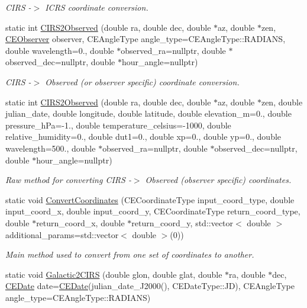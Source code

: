 \begin{DoxyCompactItemize}
\begin{DoxyCompactList}\small\item\em C\+I\+R\+S -\/$>$ I\+C\+R\+S coordinate conversion. \end{DoxyCompactList}\item 
static int \hyperlink{class_c_e_coordinates_a8b3cadaf04a15c5bb281b5aea675c7e9}{C\+I\+R\+S2\+Observed} (double ra, double dec, double $\ast$az, double $\ast$zen, \hyperlink{class_c_e_observer}{C\+E\+Observer} observer, C\+E\+Angle\+Type angle\+\_\+type=C\+E\+Angle\+Type\+::\+R\+A\+D\+I\+A\+N\+S, double wavelength=0., double $\ast$observed\+\_\+ra=nullptr, double $\ast$observed\+\_\+dec=nullptr, double $\ast$hour\+\_\+angle=nullptr)
\begin{DoxyCompactList}\small\item\em C\+I\+R\+S -\/$>$ Observed (or observer specific) coordinate conversion. \end{DoxyCompactList}\item 
static int \hyperlink{class_c_e_coordinates_aa77d308ed8537f8cd42df293e51c5eb6}{C\+I\+R\+S2\+Observed} (double ra, double dec, double $\ast$az, double $\ast$zen, double julian\+\_\+date, double longitude, double latitude, double elevation\+\_\+m=0., double pressure\+\_\+h\+Pa=-\/1., double temperature\+\_\+celsius=-\/1000, double relative\+\_\+humidity=0., double dut1=0., double xp=0., double yp=0., double wavelength=500., double $\ast$observed\+\_\+ra=nullptr, double $\ast$observed\+\_\+dec=nullptr, double $\ast$hour\+\_\+angle=nullptr)
\begin{DoxyCompactList}\small\item\em Raw method for converting C\+I\+R\+S -\/$>$ Observed (observer specific) coordinates. \end{DoxyCompactList}\item 
static void \hyperlink{class_c_e_coordinates_aa29c61ff89222c311236c48120d1120f}{Convert\+Coordinates} (C\+E\+Coordinate\+Type input\+\_\+coord\+\_\+type, double input\+\_\+coord\+\_\+x, double input\+\_\+coord\+\_\+y, C\+E\+Coordinate\+Type return\+\_\+coord\+\_\+type, double $\ast$return\+\_\+coord\+\_\+x, double $\ast$return\+\_\+coord\+\_\+y, std\+::vector$<$ double $>$ additional\+\_\+params=std\+::vector$<$ double $>$(0))
\begin{DoxyCompactList}\small\item\em Main method used to convert from one set of coordinates to another. \end{DoxyCompactList}\item 
\hypertarget{class_c_e_coordinates_a151ed16f68eb28adbb85f8895879d908}{}static void \hyperlink{class_c_e_coordinates_a151ed16f68eb28adbb85f8895879d908}{Galactic2\+C\+I\+R\+S} (double glon, double glat, double $\ast$ra, double $\ast$dec, \hyperlink{class_c_e_date}{C\+E\+Date} date=\hyperlink{class_c_e_date}{C\+E\+Date}(julian\+\_\+date\+\_\+\+J2000(), C\+E\+Date\+Type\+::\+J\+D), C\+E\+Angle\+Type angle\+\_\+type=C\+E\+Angle\+Type\+::\+R\+A\+D\+I\+A\+N\+S)\label{class_c_e_coordinates_a151ed16f68eb28adbb85f8895879d908}


\end{DoxyCompactItemize}
